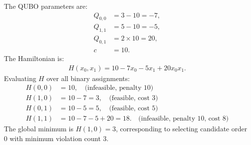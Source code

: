 \documentclass[12pt]{article}
\begin{document}
The QUBO parameters are:
\begin{align}
    Q_{0,0} &= 3 - 10 = -7, \nonumber \\
    Q_{1,1} &= 5 - 10 = -5, \nonumber \\
    Q_{0,1} &= 2 \times 10 = 20, \nonumber \\
    c &= 10.
\end{align}
The Hamiltonian is:
\begin{align}
    H(x_0, x_1) = 10 - 7x_0 - 5x_1 + 20x_0 x_1.
\end{align}
Evaluating $H$ over all binary assignments:
\begin{align}
    H(0,0) &= 10, \quad \text{(infeasible, penalty } 10\text{)} \nonumber \\
    H(1,0) &= 10 - 7 = 3, \quad \text{(feasible, cost } 3\text{)} \nonumber \\
    H(0,1) &= 10 - 5 = 5, \quad \text{(feasible, cost } 5\text{)} \nonumber \\
    H(1,1) &= 10 - 7 - 5 + 20 = 18. \quad \text{(infeasible, penalty } 10\text{, cost } 8\text{)}
\end{align}
The global minimum is $H(1,0) = 3$, corresponding to selecting candidate order $0$ with minimum violation count $3$.
\end{document}
